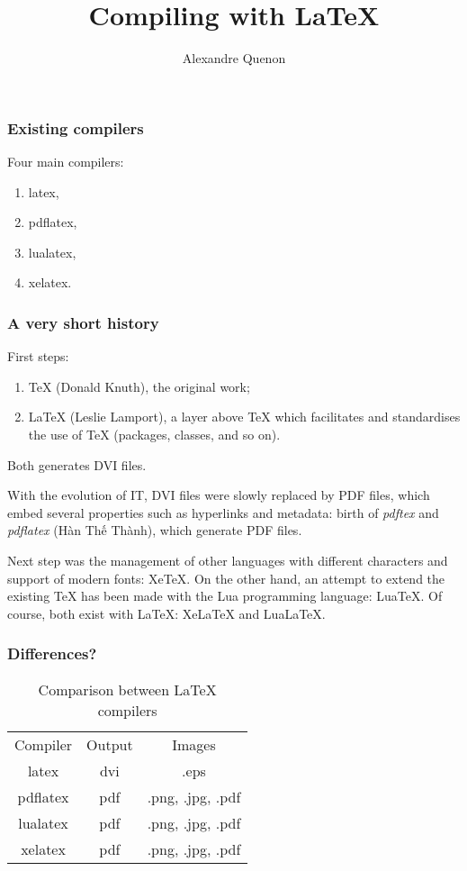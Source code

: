 \documentclass[11pt]{beamer}
\title{Compiling with \LaTeX}
\author[A. Quenon]{Alexandre Quenon}
\begin{document}

\begin{frame}
	\titlepage
\end{frame}

\begin{frame}
	\frametitle{Existing compilers}
	
	Four main compilers:
	\begin{enumerate}
		\item latex,
		\item pdflatex,
		\item lualatex,
		\item xelatex.
	\end{enumerate}
\end{frame}

\begin{frame}
	\frametitle{A very short history}
	
	First steps:
	\begin{enumerate}
		\item \TeX{} (Donald Knuth), the original work;
		\item \LaTeX{} (Leslie Lamport), a layer above \TeX{} which facilitates and standardises the use of \TeX{} (packages, classes, and so on).
	\end{enumerate}
	Both generates DVI files.

	With the evolution of IT, DVI files were slowly replaced by PDF files, which embed several properties such as hyperlinks and metadata: birth of \textit{pdftex} and \textit{pdflatex} (Hàn Thế Thành), which generate PDF files.
	
	Next step was the management of other languages with different characters and support of modern fonts: XeTeX.
	On the other hand, an attempt to extend the existing  \TeX{} has been made with the Lua programming language: LuaTeX.
	Of course, both exist with \LaTeX: XeLaTeX and LuaLaTeX.
\end{frame}

\begin{frame}
	\frametitle{Differences?}
	
	\begin{table}
		\caption{Comparison between \LaTeX{} compilers}
		\begin{tabular}{*{3}{c}}
			Compiler & Output &      Images      \\
			 latex   &  dvi   &       .eps       \\
			pdflatex &  pdf   & .png, .jpg, .pdf \\
			lualatex &  pdf   & .png, .jpg, .pdf \\
			xelatex  &  pdf   & .png, .jpg, .pdf
		\end{tabular}
	\end{table}
\end{frame}
\end{document}
